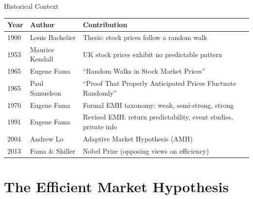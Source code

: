 \documentclass[9pt, aspectratio=169, t]{beamer}
\theoremstyle{definition}
\newenvironment{cminipage}[1]{%
    \par\noindent\hfill\begin{minipage}{#1}\ignorespaces
}{%
    \end{minipage}\hfill\null\par
}
\begin{document}
\begin{frame}{Historical Context}
\begin{cminipage}{0.95\textwidth}
\renewcommand{\arraystretch}{1.2}
\begin{center}
\begin{tabular}{lll}
\toprule
\textbf{Year} & \textbf{Author} & \textbf{Contribution} \\
\midrule
1900 & Louis Bachelier & Thesis: stock prices follow a random walk \\
1953 & Maurice Kendall & UK stock prices exhibit no predictable pattern \\
1965 & Eugene Fama & ``Random Walks in Stock Market Prices'' \\
1965 & Paul Samuelson & ``Proof That Properly Anticipated Prices Fluctuate Randomly'' \\
1970 & Eugene Fama & Formal EMH taxonomy: weak, semi-strong, strong \\
1991 & Eugene Fama & Revised EMH: return predictability, event studies, private info \\
2004 & Andrew Lo & Adaptive Market Hypothesis (AMH) \\
2013 & Fama \& Shiller & Nobel Prize (opposing views on efficiency) \\
\bottomrule
\end{tabular}
\end{center}
\end{cminipage}
\end{frame}

\section{The Efficient Market Hypothesis}
\end{document}
